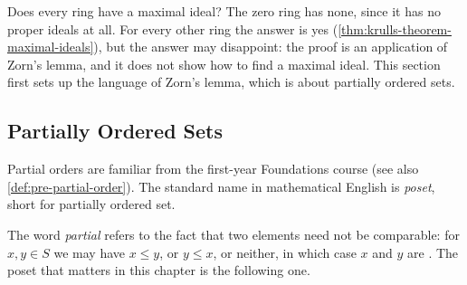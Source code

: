 Does every ring have a maximal ideal? The zero ring has none, since it has no proper ideals at all. For every other ring the answer is yes (\cref{thm:krulls-theorem-maximal-ideals}), but the answer may disappoint: the proof is an application of Zorn's lemma, and it does not show how to find a maximal ideal. This section first sets up the language of Zorn's lemma, which is about partially ordered sets.

\subsection{Partially Ordered Sets}

Partial orders are familiar from the first-year Foundations course (see also \cref{def:pre-partial-order}). The standard name in mathematical English is \emph{poset}, short for partially ordered set.


The word \emph{partial} refers to the fact that two elements need not be comparable: for $x, y \in S$ we may have $x \le y$, or $y \le x$, or neither, in which case $x$ and $y$ are . The poset that matters in this chapter is the following one.


